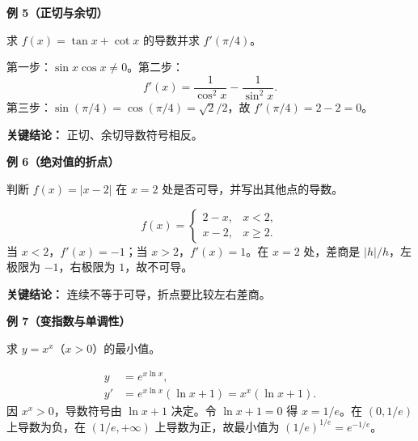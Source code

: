 \begin{examplebox}
\begin{minipage}{\linewidth}
\textbf{\textcolor{CExample}{例 5（正切与余切）}}

求 $f(x)=\tan x+\cot x$ 的导数并求 $f'(\pi/4)$。


\end{minipage}

第一步：$\sin x\cos x\ne0$。第二步：
\[
f'(x)=\frac1{\cos^2x}-\frac1{\sin^2x}.
\]
第三步：$\sin(\pi/4)=\cos(\pi/4)=\sqrt2/2$，故 $f'(\pi/4)=2-2=0$。

\textbf{关键结论：} 正切、余切导数符号相反。

\medskip
\end{examplebox}

\begin{examplebox}
\begin{minipage}{\linewidth}
\textbf{\textcolor{CExample}{例 6（绝对值的折点）}}

判断 $f(x)=|x-2|$ 在 $x=2$ 处是否可导，并写出其他点的导数。


\end{minipage}
\[
f(x)=\begin{cases}2-x,&x<2,\\x-2,&x\ge2.\end{cases}
\]
当 $x<2$，$f'(x)=-1$；当 $x>2$，$f'(x)=1$。在 $x=2$ 处，差商是 $|h|/h$，左极限为 $-1$，右极限为 $1$，故不可导。

\textbf{关键结论：} 连续不等于可导，折点要比较左右差商。

\medskip
\end{examplebox}

\begin{examplebox}
\begin{minipage}{\linewidth}
\textbf{\textcolor{CExample}{例 7（变指数与单调性）}}

求 $y=x^x$（$x>0$）的最小值。


\end{minipage}
\[
\begin{aligned}
y&=e^{x\ln x},\\
y'&=e^{x\ln x}(\ln x+1)=x^x(\ln x+1).
\end{aligned}
\]
因 $x^x>0$，导数符号由 $\ln x+1$ 决定。令 $\ln x+1=0$ 得 $x=1/e$。在 $(0,1/e)$ 上导数为负，在 $(1/e,+\infty)$ 上导数为正，故最小值为 $(1/e)^{1/e}=e^{-1/e}$。

\medskip
\end{examplebox}

